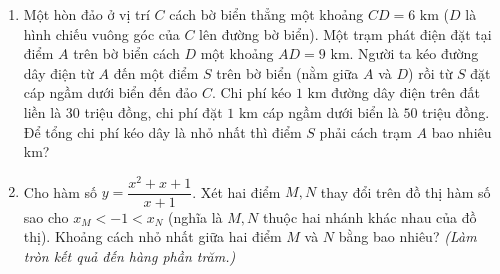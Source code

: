 \documentclass[12pt,a4paper]{article}
\begin{document}
\begin{enumerate}
\item \begin{minipage}[t]{0.56\linewidth}
Một hòn đảo ở vị trí $C$ cách bờ biển thẳng một khoảng $CD = 6\text{ km}$ ($D$ là hình chiếu vuông góc của $C$ lên đường bờ biển). Một trạm phát điện đặt tại điểm $A$ trên bờ biển cách $D$ một khoảng $AD = 9\text{ km}$. Người ta kéo đường dây điện từ $A$ đến một điểm $S$ trên bờ biển (nằm giữa $A$ và $D$) rồi từ $S$ đặt cáp ngầm dưới biển đến đảo $C$. Chi phí kéo $1\text{ km}$ đường dây điện trên đất liền là $30$ triệu đồng, chi phí đặt $1\text{ km}$ cáp ngầm dưới biển là $50$ triệu đồng. Để tổng chi phí kéo dây là nhỏ nhất thì điểm $S$ phải cách trạm $A$ bao nhiêu km?
\end{minipage}\hfill
\begin{minipage}[t]{0.41\linewidth}\vspace{-0.4\baselineskip}\centering
{}
\end{minipage}

\item Cho hàm số $y = \dfrac{x^2 + x + 1}{x + 1}$. Xét hai điểm $M, N$ thay đổi trên đồ thị hàm số sao cho $x_M < -1 < x_N$ (nghĩa là $M, N$ thuộc hai nhánh khác nhau của đồ thị). Khoảng cách nhỏ nhất giữa hai điểm $M$ và $N$ bằng bao nhiêu? \textit{(Làm tròn kết quả đến hàng phần trăm.)}


\end{enumerate}
\end{document}
